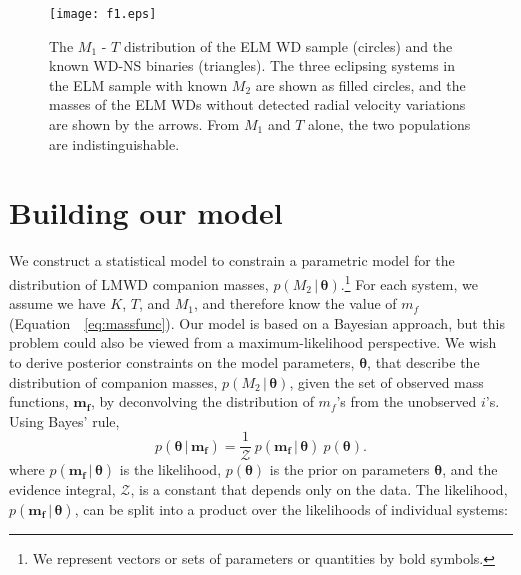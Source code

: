 \documentclass[apjl]{emulateapj}
\newcommand{\given}{\,|\,}
\newcommand{\bs}[1]{\boldsymbol{#1}}
\newcommand{\eqn}{Equation~}
\newcommand{\period}{T}
\newcommand{\mf}{m_f}
\begin{document}
\begin{figure}[h!]
\begin{center}
\texttt{[image: f1.eps]}
\caption{The $M_1$ - $\period$ distribution of the ELM WD sample (circles) and the known WD-NS binaries (triangles). The three eclipsing systems in the ELM sample with known $M_2$ are shown as filled circles, and the masses of the ELM WDs without detected radial velocity variations are shown by the arrows. From $M_1$ and $\period$ alone, the two populations are indistinguishable.}
\label{fig:Porb-M1}
\end{center}
\end{figure}

\section{Building our model}

We construct a statistical model to constrain a parametric model for the distribution of LMWD companion masses, $p(M_2 \given \bs{\theta})$.\footnote{We represent vectors or sets of parameters or quantities by bold symbols.} For each system, we assume we have $K$, $T$, and $M_1$, and therefore know the value of $\mf$ (\eqn~\ref{eq:massfunc}). Our model is based on a Bayesian approach, but this problem could also be viewed from a maximum-likelihood perspective. We wish to derive posterior constraints on the model parameters, $\bs{\theta}$, that describe the distribution of companion masses, $p(M_2\given \bs{\theta})$, given the set of observed mass functions, $\bs{m_f}$, by deconvolving the distribution of $\mf$'s from the unobserved $i$'s. Using Bayes' rule,
\begin{equation}
    p(\bs{\theta} \given \bs{\mf}) = \frac{1}{\mathcal{Z}}~p(\bs{\mf} \given \bs{\theta})~p(\bs{\theta}).
\end{equation}
where $p(\bs{\mf} \given \bs{\theta})$ is the likelihood, $p(\bs{\theta})$ is the prior on parameters $\bs{\theta}$, and the evidence integral, $\mathcal{Z}$, is a constant that depends only on the data. The likelihood, $p(\bs{\mf} \given \bs{\theta})$, can be split into a product over the likelihoods of individual systems:
\end{document}
